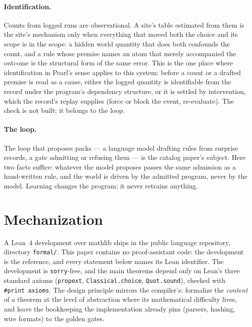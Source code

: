 \documentclass[11pt]{article}
\theoremstyle{plain}
\theoremstyle{definition}
\theoremstyle{remark}
\begin{document}
\paragraph{Identification.} Counts from logged runs are observational.
A site's table estimated from them is the site's mechanism only when
everything that moved both the choice and its scope is in the scope: a
hidden world quantity that does both confounds the count, and a rule
whose premise names an atom that merely accompanied the outcome is the
structural form of the same error. This is the one place where
identification in Pearl's sense \cite{SP06} applies to this system:
before a count or a drafted premise is read as a cause, either the
logged quantity is identifiable from the record under the program's
dependency structure, or it is settled by intervention, which the
record's replay supplies (force or block the event, re-evaluate). The
check is not built; it belongs to the loop.

\paragraph{The loop.} The loop that proposes packs --- a language model
drafting rules from surprise records, a gate admitting or refusing them
--- is the catalog paper's subject. Here two facts suffice: whatever
the model proposes passes the same admission as a hand-written rule,
and the world is driven by the admitted program, never by the model.
Learning changes the program; it never retrains anything.

\section{Mechanization}\label{sec:mech}

A Lean~4 development over mathlib ships in the public language
repository, directory \texttt{formal/}. This paper contains no
proof-assistant code: the development is the reference, and every
statement below names its Lean identifier. The development is
\texttt{sorry}-free, and the main theorems depend only on Lean's three
standard axioms (\texttt{propext}, \texttt{Classical.choice},
\texttt{Quot.sound}), checked with \texttt{\#print axioms}.
The design principle mirrors the compiler's: formalize the
\emph{content} of a theorem at the level of abstraction where its
mathematical difficulty lives, and leave the bookkeeping the
implementation already pins (parsers, hashing, wire formats) to the
golden gates.
\end{document}
